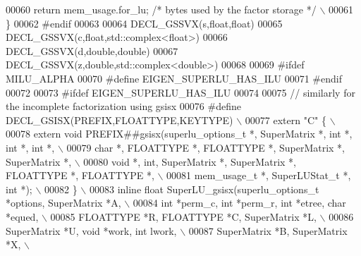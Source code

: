 \begin{DoxyCode}
00060 \textcolor{preprocessor}{    return mem\_usage.for\_lu; }\textcolor{comment}{/* bytes used by the factor storage */}\textcolor{preprocessor}{                                       \(\backslash\)}
00061 \textcolor{preprocessor}{  \}}
00062 \textcolor{preprocessor}{#endif}
00063 
00064 DECL\_GSSVX(s,\textcolor{keywordtype}{float},\textcolor{keywordtype}{float})
00065 DECL\_GSSVX(c,\textcolor{keywordtype}{float},std::complex<float>)
00066 DECL\_GSSVX(d,\textcolor{keywordtype}{double},\textcolor{keywordtype}{double})
00067 DECL\_GSSVX(z,\textcolor{keywordtype}{double},std::complex<double>)
00068 
00069 \textcolor{preprocessor}{#ifdef MILU\_ALPHA}
00070 \textcolor{preprocessor}{#define EIGEN\_SUPERLU\_HAS\_ILU}
00071 \textcolor{preprocessor}{#endif}
00072 
00073 \textcolor{preprocessor}{#ifdef EIGEN\_SUPERLU\_HAS\_ILU}
00074 
00075 \textcolor{comment}{// similarly for the incomplete factorization using gsisx}
00076 \textcolor{preprocessor}{#define DECL\_GSISX(PREFIX,FLOATTYPE,KEYTYPE)                                                    \(\backslash\)}
00077 \textcolor{preprocessor}{    extern "C" \{                                                                                \(\backslash\)}
00078 \textcolor{preprocessor}{      extern void PREFIX##gsisx(superlu\_options\_t *, SuperMatrix *, int *, int *, int *,        \(\backslash\)}
00079 \textcolor{preprocessor}{                         char *, FLOATTYPE *, FLOATTYPE *, SuperMatrix *, SuperMatrix *,        \(\backslash\)}
00080 \textcolor{preprocessor}{                         void *, int, SuperMatrix *, SuperMatrix *, FLOATTYPE *, FLOATTYPE *,   \(\backslash\)}
00081 \textcolor{preprocessor}{                         mem\_usage\_t *, SuperLUStat\_t *, int *);                        \(\backslash\)}
00082 \textcolor{preprocessor}{    \}                                                                                           \(\backslash\)}
00083 \textcolor{preprocessor}{    inline float SuperLU\_gsisx(superlu\_options\_t *options, SuperMatrix *A,                      \(\backslash\)}
00084 \textcolor{preprocessor}{         int *perm\_c, int *perm\_r, int *etree, char *equed,                                     \(\backslash\)}
00085 \textcolor{preprocessor}{         FLOATTYPE *R, FLOATTYPE *C, SuperMatrix *L,                                            \(\backslash\)}
00086 \textcolor{preprocessor}{         SuperMatrix *U, void *work, int lwork,                                                 \(\backslash\)}
00087 \textcolor{preprocessor}{         SuperMatrix *B, SuperMatrix *X,                                                        \(\backslash\)}

\end{DoxyCode}
